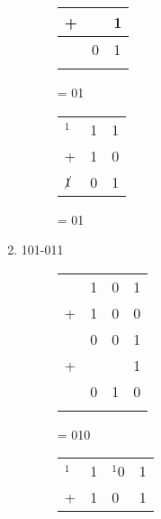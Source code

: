 \begin{enumerate}[label=(\alph*)]
\begin{figure}[H]
\begin{minipage}[t]{0.45\textwidth}
\begin{table}[H]
\begin{tabularx}{0.3\textwidth}{XXX}
                + & & 1\\
                \hline
                & 0 & 1\\
                \hline
                &  & \\
            \end{tabularx}
        \end{table}
        = 01
    \end{minipage}\hfill
    \begin{minipage}[t]{0.45\textwidth}
        \begin{table}[H]
            \begin{tabularx}{0.3\textwidth}{XXX}
                $^1$& 1 & 1\\
                + & 1 & 0\\
                \hline
                $\cancel{1}$ & 0 & 1 \\
                \hline
            \end{tabularx}
        \end{table}
        = 01
    \end{minipage}\hfill
\end{figure}
\item 101-011
\begin{figure}[H]
    \begin{minipage}[t]{0.45\textwidth}
        \begin{table}[H]
            \begin{tabularx}{0.4\textwidth}{XXXX}
                &  1& 0 & 1\\
                + & 1& 0 & 0\\
                \hline
                & 0 & 0 & 1 \\
                + & & & 1\\
                \hline
                & 0 & 1 & 0\\
                \hline
                &  & \\
            \end{tabularx}
        \end{table}
        = 010
    \end{minipage}\hfill
    \begin{minipage}[t]{0.45\textwidth}
        \begin{table}[H]
            \begin{tabularx}{0.4\textwidth}{XXXX}
                $^1$& 1 & $^1$0 & 1\\
                + & 1 & 0 & 1\\

\end{tabularx}
\end{table}
\end{minipage}
\end{figure}
\end{enumerate}
